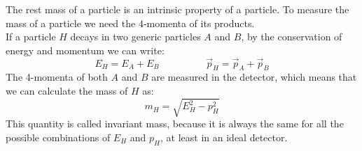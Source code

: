 \documentclass[12pt]{article}
\begin{document}
The rest mass of a particle is an intrinsic property of a particle. To measure the mass of a particle we
need the 4-momenta of its products. \\
If a particle $H$ decays in two generic particles $A$ and $B$, by the conservation of energy and momentum
we can write:
\begin{equation}
	E_H = E_A + E_B \hspace{2cm} \vec{p}_H = \vec{p}_A + \vec{p}_B
\end{equation}
The 4-momenta of both $A$ and $B$ are measured in the detector, which means that we can calculate the mass
of $H$ as:
\begin{equation}
  m_H = \sqrt{E^2_H - p^2_H}
\end{equation}
This quantity is called invariant mass, because it is always the same for all the possible combinations of
$E_H$ and $p_H$, at least in an ideal detector.
\end{document}
